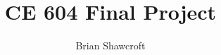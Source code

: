 \documentclass[twoside,leqno,onecolumn]{article}
\begin{document}
%

\title{\Large {CE 604 Final Project}}
    \author{
   Brian Shawcroft
    }    

\date{}

\maketitle

\fancyfoot[C]{\thepage}








%
%
%
%
%
%
%
%
%
%
%

\newpage 

%
%
\newpage

%
%
\end{document}
